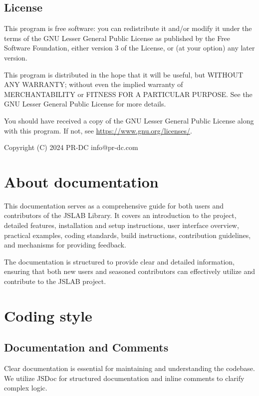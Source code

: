 \documentclass[12pt,a4paper]{article}
\newcommand{\yearvar}{2024}
\begin{document}
\subsection{License}
This program is free software: you can redistribute it and/or modify it under the terms of the GNU Lesser General Public License as published by the Free Software Foundation, either version 3 of the License, or (at your option) any later version.

This program is distributed in the hope that it will be useful, but WITHOUT ANY WARRANTY; without even the implied warranty of MERCHANTABILITY or FITNESS FOR A PARTICULAR PURPOSE. See the GNU Lesser General Public License for more details.

You should have received a copy of the GNU Lesser General Public License along with this program. If not, see \url{https://www.gnu.org/licenses/}.

\vspace{5mm}

Copyright (C) \yearvar\; PR-DC info@pr-dc.com

\vspace{8mm}

\section{About documentation}

This documentation serves as a comprehensive guide for both users and contributors of the JSLAB Library. It covers an introduction to the project, detailed features, installation and setup instructions, user interface overview, practical examples, coding standards, build instructions, contribution guidelines, and mechanisms for providing feedback.

The documentation is structured to provide clear and detailed information, ensuring that both new users and seasoned contributors can effectively utilize and contribute to the JSLAB project.

\section{Coding style}
\label{coding-style}

\subsection{Documentation and Comments}

Clear documentation is essential for maintaining and understanding the codebase. We utilize JSDoc for structured documentation and inline comments to clarify complex logic.
\end{document}

